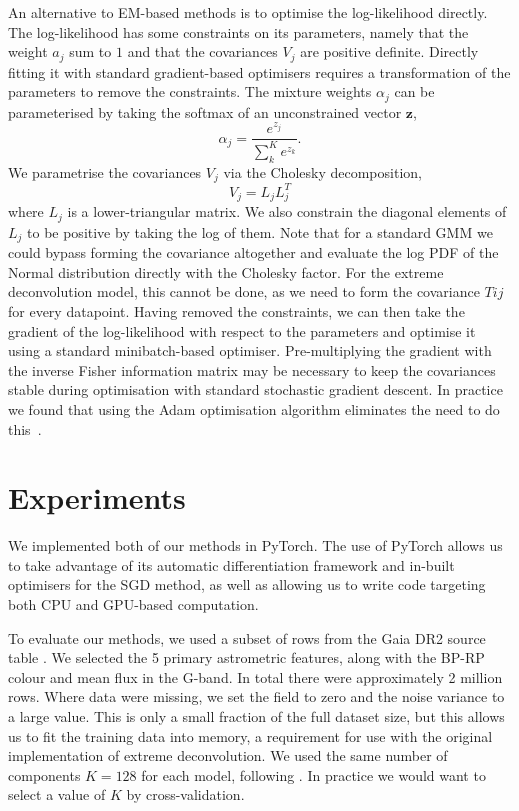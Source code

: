 \documentclass{article}
\begin{document}
An alternative to EM-based methods is to optimise the log-likelihood directly.
The log-likelihood has some constraints on its parameters, namely that the weight $a_j$ sum to $1$ and that the covariances $V_j$ are positive definite.
Directly fitting it with standard gradient-based optimisers requires a transformation of the parameters to remove the constraints.
The mixture weights $\alpha_j$ can be parameterised by taking the softmax of an unconstrained vector $\mathbf{z}$,
\begin{equation}
\alpha_j = \frac{e^{z_j}}{\sum_k^K e^{z_k}}.
\end{equation}
We parametrise the covariances $V_j$ via the Cholesky decomposition, 
\begin{equation}
  V_j = L_jL_j^T
\end{equation}
where $L_j$ is a lower-triangular matrix.
We also constrain the diagonal elements of $L_j$ to be positive by taking the log of them.
Note that for a standard GMM we could bypass forming the covariance altogether and evaluate the log PDF of the Normal distribution directly with the Cholesky factor.
For the extreme deconvolution model, this cannot be done, as we need to form the covariance $Tij$ for every datapoint.
Having removed the constraints, we can then take the gradient of the log-likelihood with respect to the parameters and optimise it using a standard minibatch-based optimiser.
Pre-multiplying the gradient with the inverse Fisher information matrix may be necessary to keep the covariances stable during optimisation with standard stochastic gradient descent.
In practice we found that using the Adam optimisation algorithm eliminates the need to do this~\cite{kingmaAdamMethodStochastic2014}.

\section{Experiments}

We implemented both of our methods in PyTorch.
The use of PyTorch allows us to take advantage of its automatic differentiation framework and in-built optimisers for the SGD method,
as well as allowing us to write code targeting both CPU and GPU-based computation.

To evaluate our methods, we used a subset of rows from the Gaia DR2 source table \cite{brownGaiaDataRelease2018}.
We selected the 5 primary astrometric features, along with the BP-RP colour and mean flux in the G-band.
In total there were approximately 2 million rows.
Where data were missing, we set the field to zero and the noise variance to a large value.
This is only a small fraction of the full dataset size, but this allows us to fit the training data into memory, a requirement for use with the original implementation of extreme deconvolution.
We used the same number of components $K=128$ for each model, following \cite{andersonImprovingGaiaParallax2018}.
In practice we would want to select a value of $K$ by cross-validation.
\end{document}
